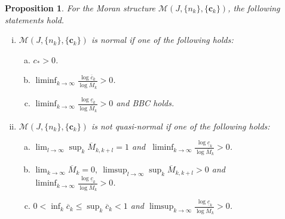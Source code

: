 \documentclass[12pt]{amsart}
\numberwithin{equation}{section}
\theoremstyle{plain}
\newtheorem{proposition}[theorem]{Proposition}
\theoremstyle{remark}
\theoremstyle{definition}
\newcommand{\om}{\overline{M}}
\newcommand{\ccc}{\mathbf{c}}
\newcommand{\f}{\frac}
\newcommand{\oc}{\overline{c}}
\newcommand{\uc}{\underline{c}}
\renewcommand{\le}{\leqslant}
\begin{document}
	\begin{proposition}\label{quasihomo}
For the Moran structure $\mathcal{M}(J,\{n_k\},\{\ccc_k\})$, the following statements hold. 
		\begin{enumerate}[(i)]
			\item $\mathcal{M}(J,\{n_k\},\{\ccc_k\})$ is normal if one of the following  holds:
			\begin{enumerate}[(a)]
				\item $c_*>0$. 
				\item $\liminf_{k\to\infty}\f{\log \oc_k}{\log \om_k}>0$. 
				\item $\liminf_{k\to\infty}\f{\log \uc_k}{\log \om_k}>0$ and BBC holds. 
			\end{enumerate}
			
			\item $\mathcal{M}(J,\{n_k\},\{\ccc_k\})$ is not quasi-normal if one of the following  holds:%
			\begin{enumerate}[(a)]
				\item $\lim_{l\to\infty}\sup_k \om_{k,k+l}=1$ and $  \ \liminf_{k\to\infty}\f{\log \uc_k}{\log \om_k}>0$.    %
				\item $\lim_{k\to\infty} \om_k=0,\ \limsup_{l\to\infty}\sup_k \om_{k,k+l}>0$ and $ \liminf_{k\to\infty}\f{\log \uc_k}{\log \om_k}>0$.      %
				\item $0<\inf_k \oc_k\le\sup_k \oc_k<1$ and $ \limsup_{k\to\infty}\f{\log \uc_k}{\log \om_k}>0$.
			\end{enumerate} 
		\end{enumerate}
	\end{proposition}
\end{document}
